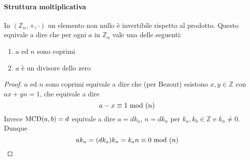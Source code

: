 \paragraph{Struttura moltiplicativa}
\begin{proposizione}
	In $\left(\mathbb{Z}_n,+,\cdot\right)$ un elemento non nullo è invertibile rispetto al prodotto. Questo equivale a dire che per ogni $a$ in $\mathbb{Z}_n$ vale una delle seguenti:
	\begin{enumerate}
		\item $a$ ed $n$ sono coprimi
		\item $a$ è un divisore dello zero
	\end{enumerate}
\end{proposizione}
\begin{proof}
	$a$ ed $n$ sono coprimi equivale a dire che (per Bezout) esistono $x,y\in\mathbb{Z}$ con $ax+yn=1$, che equivale a dire
	\begin{equation*}
	a-x\equiv1\ \mathrm{mod}\ (n)
	\end{equation*}
	Invece $\operatorname{\mathrm{MCD}}(a,b)=d$ equivale a dire $a=dk_a$, $n=dk_n$ per $k_a,k_b\in\mathbb{Z}$ e $k_n\neq0$. Dunque 
	\begin{equation*}
	ak_n=(dk_a)k_n=k_an\equiv0\ \mathrm{mod}\ (n)
	\end{equation*}
\end{proof}
